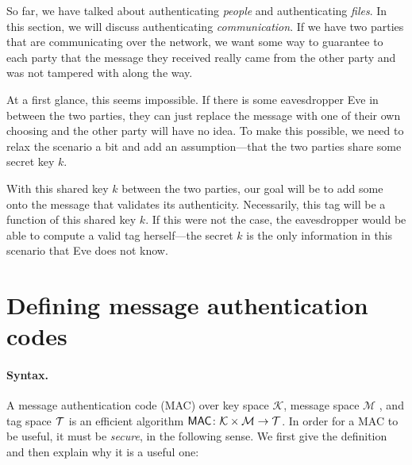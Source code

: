 \label{lec:mac}

So far, we have talked about authenticating \emph{people} and authenticating \emph{files}. In this section, we will discuss authenticating \emph{communication}. If we have two parties that are communicating over the network, we want some way to guarantee to each party that the message they received really came from the other party and was not tampered with along the way.

At a first glance, this seems impossible. If there is some eavesdropper Eve in between the two parties, they can just replace the message with one of their own choosing and the other party will have no idea. To make this possible, we need to relax the scenario a bit and add an assumption---that the two parties share some secret key $k$. 

With this shared key $k$ between the two parties, our goal will be to add some  onto the message that validates its authenticity. Necessarily, this tag will be a function of this shared key $k$. If this were not the case, the eavesdropper would be able to compute a valid tag herself---the secret $k$ is the only information in this scenario that Eve does not know.



\section{Defining message authentication codes}

\paragraph{Syntax.}
A message authentication code (MAC) 
over key space $\mathcal{K}$, 
message space $\mathcal{M}$ , and tag space $\mathcal{T}$
is an efficient algorithm 
$\mathsf{MAC} \colon \mathcal{K} \times \mathcal{M} \to \mathcal{T}$.
In order for a MAC to be useful, it must be \emph{secure},
in the following sense.
We first give the definition and then explain why it is a useful
one:

